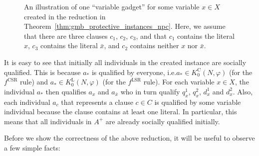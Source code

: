 \documentclass[
    12pt,               %
    a4paper,            %
    bibtotoc,           %
    pointlessnumbers,   %
    ngerman,            %
    titlepage,          %
    leqno,              %
    ]{scrarticle}       %
\newcommand\thmref{Theorem~\ref}
\newcommand{\variablegadget}{
\node (o) {};

\node[main node] (aa)   [left of = o, node distance = 2.5cm] {$a_\ast$};
\node[main node] (ax2)  [above of = o, node distance = 3.5cm] {$a_{\bar{x}}$};
\node[main node] (ax1)  [above of = ax2] {$a_x$};

\node[main node] (c1)   [left of = ax1, node distance = 5cm, yshift = 0.9cm] {$a_{c_1}$};
\node[main node] (c2)   [below of = c1] {$a_{c_2}$};
\node[main node] (c3)   [below of = c2] {$a_{c_3}$};

\node (i1) [above left of = aa] {};
\node (i2) [above right of = aa] {};
\node (i3) [left of = i1, node distance = 1cm] {};
\node (i4) [right of = i2, node distance = 1cm] {};

\path[->]
(aa)    edge[loop below]        node {} (aa)
        edge[bend left=10]      node {} (ax1)
        edge[bend left=0]       node {} (ax2)
(ax1)   edge[bend right=30]     node {} (c1)
(ax2)   edge[bend left=30]      node {} (c3)
(i1)    edge[bend right=10]     node {} (aa)
(i2)    edge[bend left=10]      node {} (aa)
(i3)    edge[bend right=10]     node {} (aa)
(i4)    edge[bend left=10]      node {} (aa)
;

\draw [very thick, decorate, decoration = {brace, raise=5pt, amplitude=5pt}]
(-5.8, 7.2) -- (-1.8, 7.2)
node[pos = 0.5, above = 10pt, black] {$A^+$};
}
\begin{document}
\begin{Proof}
\begin{figure}[!tbh]
{
}
\caption{An illustration of one ``variable gadget'' for some variable $x \in X$ created in the reduction in \thmref{thm:gmb_protective_instances_npc}. Here, we assume that there are three clauses $c_1$, $c_2$, $c_3$, and that $c_1$ contains the literal $x$, $c_3$ contains the literal $\bar{x}$, and $c_2$ contains neither $x$ nor $\bar{x}$.}
\label{fig:gmb_variable_gadget}
\end{figure}



It is easy to see that initially all individuals in the created instance are socially qualified. This is because $a_\ast$ is qualified by everyone, i.e.\@ $a_\ast \in K^{\text{C}}_0(N, \varphi)$ (for the $f^{\text{CSR}}$ rule) and $a_\ast \in K^{\text{L}}_0(N, \varphi)$ (for the $f^{\text{LSR}}$ rule). For each variable $x \in X$, the individual $a_\ast$ then qualifies $a_x$ and $a_{\bar{x}}$ who in turn qualify $q_x^1$, $q_x^2$, $d_x^1$ and $d_x^2$. Also, each individual $a_c$ that represents a clause $c \in C$ is qualified by some variable individual because the clause contains at least one literal. In particular, this means that all individuals in $A^+$ are already socially qualified initially.

Before we show the correctness of the above reduction, it will be useful to observe a few simple facts:


\end{Proof}
\end{document}

